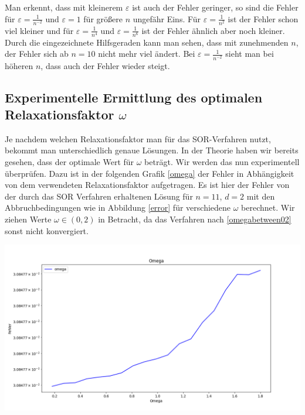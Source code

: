 \documentclass[smallheadings]{scrartcl}
\theoremstyle{definition}
\begin{document}
 Man erkennt, dass mit kleinerem $\varepsilon$ ist auch der Fehler geringer, so sind die Fehler für $\varepsilon =\frac{1}{n^{-2}}$ und $\varepsilon =1$ für größere $n$ ungefähr Eins.    Für $\varepsilon =\frac{1}{n^{2}}$ ist der Fehler schon viel kleiner und für  $\varepsilon =\frac{1}{n^{4}}$ und  $\varepsilon =\frac{1}{n^{6}}$ ist der Fehler ähnlich aber noch kleiner.  Durch die eingezeichnete Hilfsgeraden kann man sehen, dass mit zunehmenden $n$, der Fehler sich ab $n=10$ nicht mehr viel ändert.  Bei $\varepsilon = \frac{1}{n^{-2}}$ sieht man bei höheren $n$, dass auch der Fehler wieder steigt.

\subsection{Experimentelle Ermittlung des optimalen Relaxationsfaktor $\omega$}
Je nachdem welchen Relaxationsfaktor man für das SOR-Verfahren nutzt,  bekommt man unterschiedlich genaue Lösungen.  In der Theorie haben wir bereits gesehen, dass der optimale Wert für $\omega$ beträgt.  Wir werden das nun experimentell überprüfen.  Dazu ist in der folgenden Grafik \ref{omega}
 der Fehler in Abhängigkeit von dem verwendeten Relaxationsfaktor aufgetragen.  Es ist hier der Fehler von der durch das SOR Verfahren erhaltenen Lösung für $n=11$, $d=2$ mit den Abbruchbedingungen wie in Abbildung \ref{error} für verschiedene $\omega$ berechnet. Wir ziehen Werte $\omega \in (0,2)$ in Betracht, da das Verfahren nach \ref{omegabetween02} sonst nicht konvergiert.

\begin{minipage}{\textwidth}

 \centering
 \includegraphics[scale = 0.5]{Omega1}
 	\label{omega}

 \end{minipage}
		 
\end{document}
